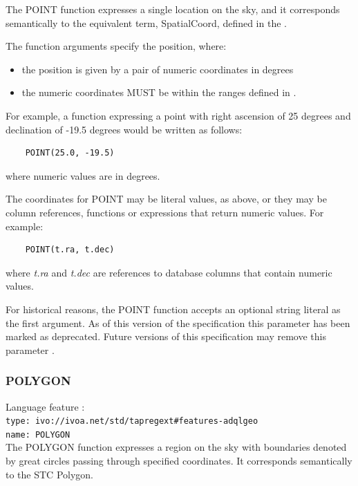 \documentclass[11pt,a4paper]{ivoa}
\begin{document}
The POINT function expresses a single location on the sky,
and it corresponds semantically to the equivalent term, SpatialCoord, defined in
the \STCSpec{}.

The function arguments specify the position, where:
\begin{itemize}
    \item the position is given by a pair of numeric coordinates in degrees
    \item the numeric coordinates MUST be within the ranges defined in
    .
\end{itemize}

For example, a function expressing a point with right ascension of 25 degrees
and declination of -19.5 degrees would be written as follows:
\begin{verbatim}
    POINT(25.0, -19.5)
\end{verbatim}
\noindent
where numeric values are in degrees.

The coordinates for POINT may be literal values, as above,
or they may be column references, functions or expressions that return
numeric values.
For example:
\begin{verbatim}
    POINT(t.ra, t.dec)
\end{verbatim}
\noindent
where \textit{t.ra} and \textit{t.dec} are references to database
columns that contain numeric values.

For historical reasons, the POINT function accepts an optional string literal
as the first argument.
As of this version of the specification this parameter has been
marked as deprecated.
Future versions of this specification may remove this parameter
.

\subsubsection{POLYGON}
\label{sec:functions.geom.polygon}
{\footnotesize Language feature :}\\
{\footnotesize \verb|type: ivo://ivoa.net/std/tapregext#features-adqlgeo|}\\
{\footnotesize \verb|name: POLYGON|}\\

The POLYGON function expresses a region on the sky with boundaries denoted by great
circles passing through specified coordinates. It corresponds semantically
to the STC Polygon.
\end{document}
